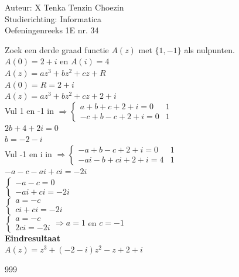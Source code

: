 \documentclass[a4paper]{article}
\begin{document}
  
\noindent \large Auteur: X Tenka Tenzin Choezin \\
\noindent \large Studierichting: Informatica\\
\noindent \large Oefeningenreeks 1E nr. 34\\

\medskip

\normalsize

Zoek een derde graad functie $A(z)$ met $\{1, -1\}$ als nulpunten.\\

$A(0) = 2 + i$ en $A(i) = 4$\\

$A(z) = az^3 + bz^2 + cz + R$\\

$A(0) = R = 2 + i$\\

$A(z) = az^3 + bz^2 + cz + 2 + i$\\

Vul 1 en -1 in $\Rightarrow \left\{
\begin{array}{l|l}
	a + b + c + 2 + i = 0  & 1\\
   	-c + b - c + 2 + i = 0 & 1
\end{array}
\right.$\\

$2b + 4 + 2i = 0$\\

$b = -2 - i$\\

Vul -1 en i in $\Rightarrow \left\{
\begin{array}{l|l}
	-a + b - c + 2 + i = 0 & 1\\
	-ai - b + ci + 2 + i = 4 & 1
\end{array}
\right.$\\

$-a - c - ai + ci = -2i$\\

$\left\{ 
\begin{array}{l}
	-a - c = 0 \\
	-ai + ci = -2i
\end{array}
\right.$\\

$\left\{ 
\begin{array}{l}
	a = -c \\
	ci + ci = -2i
\end{array}
\right.$\\

$\left\{ 
\begin{array}{l}
	a = -c \\
	2ci = -2i
\end{array}
\right. \Rightarrow a = 1 $ en $c = -1$\\

\textbf{Eindresultaat}\\

$A(z) = z^3 + (-2 - i)z^2 - z + 2 + i$\\

\begin{thebibliography}{999}
\end{thebibliography}
\end{document}

